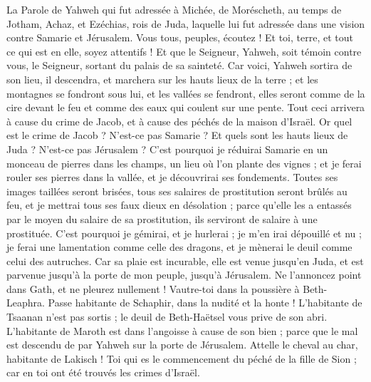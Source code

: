 \begin{multicols}{2}
\VerseOne{}La Parole de Yahweh qui fut adressée à Michée, de Moréscheth, au temps de Jotham, Achaz, et Ezéchias, rois de Juda, laquelle lui fut adressée dans une vision contre Samarie et Jérusalem.
Vous tous, peuples, écoutez ! Et toi, terre, et tout ce qui est en elle, soyez attentifs ! Et que le Seigneur, Yahweh, soit témoin contre vous, le Seigneur, sortant du palais de sa sainteté.
Car voici, Yahweh sortira de son lieu, il descendra, et marchera sur les hauts lieux de la terre ;
et les montagnes se fondront sous lui, et les vallées se fendront, elles seront comme de la cire devant le feu et comme des eaux qui coulent sur une pente.
Tout ceci arrivera à cause du crime de Jacob, et à cause des péchés de la maison d'Israël. Or quel est le crime de Jacob ? N'est-ce pas Samarie ? Et quels sont les hauts lieux de Juda ? N'est-ce pas Jérusalem ?
C'est pourquoi je réduirai Samarie en un monceau de pierres dans les champs, un lieu où l'on plante des vignes ; et je ferai rouler ses pierres dans la vallée, et je découvrirai ses fondements.
Toutes ses images taillées seront brisées, tous ses salaires de prostitution seront brûlés au feu, et je mettrai tous ses faux dieux en désolation ; parce qu'elle les a entassés par le moyen du salaire de sa prostitution, ils serviront de salaire à une prostituée.
C'est pourquoi je gémirai, et je hurlerai ; je m'en irai dépouillé et nu ; je ferai une lamentation comme celle des dragons, et je mènerai le deuil comme celui des autruches.
Car sa plaie est incurable, elle est venue jusqu'en Juda, et est parvenue jusqu'à la porte de mon peuple, jusqu'à Jérusalem.
Ne l'annoncez point dans Gath, et ne pleurez nullement ! Vautre-toi dans la poussière à Beth-Leaphra.
Passe habitante de Schaphir, dans la nudité et la honte ! L'habitante de Tsaanan n'est pas sortis ; le deuil de Beth-Haëtsel vous prive de son abri.
L'habitante de Maroth est dans l'angoisse à cause de son bien ; parce que le mal est descendu de par Yahweh sur la porte de Jérusalem.
Attelle le cheval au char, habitante de Lakisch ! Toi qui es le commencement du péché de la fille de Sion ; car en toi ont été trouvés les crimes d'Israël.

\end{multicols}
